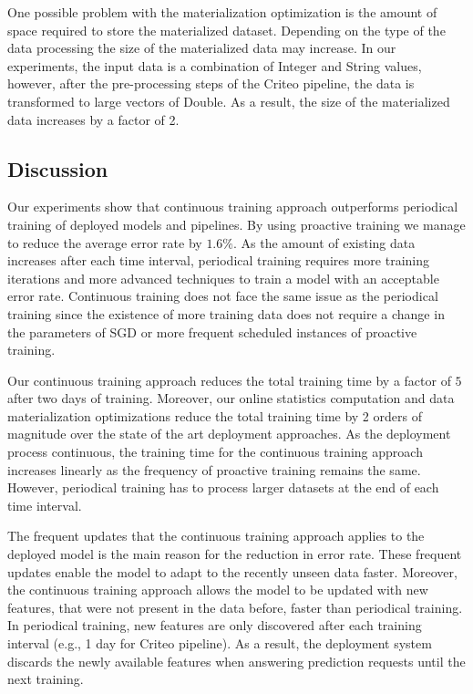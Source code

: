 One possible problem with the materialization optimization is the amount of space required to store the materialized dataset.
Depending on the type of the data processing the size of the materialized data may increase.
In our experiments, the input data is a combination of Integer and String values, however, after the pre-processing steps of the Criteo pipeline, the data is transformed to large vectors of Double.
As a result, the size of the materialized data increases by a factor of 2.

\subsection{Discussion} \label{subsec:discussion}
Our experiments show that continuous training approach outperforms periodical training of deployed models and pipelines.
By using proactive training we manage to reduce the average error rate by $1.6\%$.
As the amount of existing data increases after each time interval, periodical training requires more training iterations and more advanced techniques to train a model with an acceptable error rate.
Continuous training does not face the same issue as the periodical training since the existence of more training data does not require a change in the parameters of SGD or more frequent scheduled instances of proactive training. 

Our continuous training approach reduces the total training time by a factor of $5$ after two days of training.
Moreover, our online statistics computation and data materialization optimizations reduce the total training time by 2 orders of magnitude over the state of the art deployment approaches.
As the deployment process continuous, the training time for the continuous training approach increases linearly as the frequency of proactive training remains the same.
However, periodical training has to process larger datasets at the end of each time interval.

The frequent updates that the continuous training approach applies to the deployed model is the main reason for the reduction in error rate.
These frequent updates enable the model to adapt to the recently unseen data faster.
Moreover, the continuous training approach allows the model to be updated with new features, that were not present in the data before, faster than periodical training.
In periodical training, new features are only discovered after each training interval (e.g., 1 day for Criteo pipeline).
As a result, the deployment system discards the newly available features when answering prediction requests until the next training.

